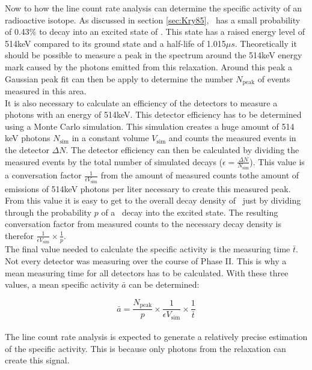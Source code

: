 \documentclass[encoding=utf8,british]{tumphthesis}
\begin{document}
Now to how the line count rate analysis can determine the specific activity of an radioactive isotope.
As discussed in section \ref{sec:Kry85}, \Kr\ has a small probability of 0.43\% to decay into an excited state of . 
This state has a raised energy level of 514keV compared to its ground state and a half-life of 1.015\(\unit{\mu s}\). 
Theoretically it should be possible to measure a peak in the spectrum around the 514keV energy mark caused by the photons emitted from this relaxation.
Around this peak a Gaussian peak fit can then be apply to determine the number $N_{\mathrm{peak}}$ of events measured in this area. 
\\

It is also necessary to calculate an efficiency of the detectors to measure a photons with an energy of 514keV.
This detector efficiency has to be determined using a Monte Carlo simulation.
This simulation creates a huge amount of 514 keV photons $N_{\mathrm{sim}}$  in a constant volume $V_{\mathrm{sim}}$ and counts the measured events in the detector $\Delta N$. 
The detector efficiency can then be calculated by dividing the measured events by the total number of simulated decays ($\epsilon = \frac{\Delta N}{N_{\mathrm{sim}}}$).
This value is a conversation factor $\frac{1}{\epsilon V_{\mathrm{sim}}}$ from the amount of measured counts tothe amount of emissions of 514keV photons per liter necessary to create this measured peak.
From this value it is easy to get to the overall decay density of \Kr\ just by dividing through the probability $p$ of a \Kr\ decay into the excited  state.
The resulting conversation factor from measured counts to the necessary decay density is therefor $\frac{1}{\epsilon V_{\mathrm{sim}}} \times \frac{1}{p}$.
\\

The final value needed to calculate the specific activity is the measuring time $\bar{t}$.
Not every detector was measuring over the course of Phase II.
This is why a mean measuring time for all detectors has to be calculated.
With these three values, a mean specific activity $\bar{a}$ can be determined:

\begin{equation}
    \bar{a} = \frac{N_{\mathrm{peak}}}{p}\times\frac{1}{\epsilon V_{\mathrm{sim}}}\times\frac{1}{\bar{t}}
    \label{equ:activityDieErste}
\end{equation}\\

The line count rate analysis is expected to generate a relatively precise estimation of the specific activity.
This is because only photons from the  relaxation can create this signal.
\\
\end{document}

